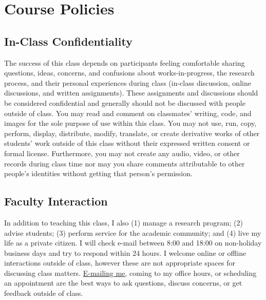 \documentclass[11pt]{memoir}
\begin{document}
\section{Course Policies}

\subsection{In-Class Confidentiality}
The success of this class depends on participants feeling comfortable sharing questions, ideas, concerns, and confusions about works-in-progress, the research process, and their personal experiences during class (in-class discussion, online discussions, and written assignments). These assignments and discussions should be considered confidential and generally should not be discussed with people outside of class. You may read and comment on classmates' writing, code, and images for the sole purpose of use within this class. You may not use, run, copy, perform, display, distribute, modify, translate, or create derivative works of other students' work outside of this class without their expressed written consent or formal license. Furthermore, you may not create any audio, video, or other records during class time nor may you share comments attributable to other people's identities without getting that person's permission.

\subsection{Faculty Interaction}
In addition to teaching this class, I also (1) manage a research program; (2) advise students; (3) perform service for the academic community; and (4) live my life as a private citizen. I will check e-mail between 8:00 and 18:00 on non-holiday business days and try to respond within 24 hours. I welcome online or offline interactions outside of class, however these are not appropriate spaces for discussing class matters. \href{maito:brian.keegan@colorado.edu}{E-mailing me}, coming to my office hours, or scheduling an appointment are the best ways to ask questions, discuss concerns, or get feedback outside of class.
\end{document}

